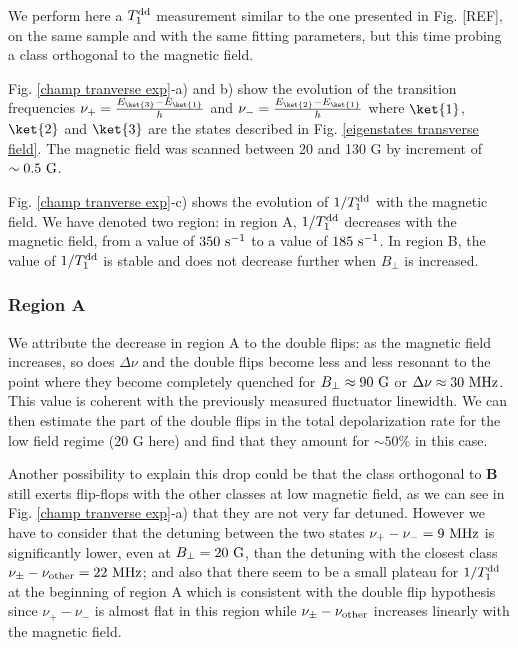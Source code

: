\documentclass[a4paper,11pt]{report}
\begin{document}
\begin{refsection}
We perform here a $T_1^{\rm dd}$ measurement similar to the one presented in Fig. [REF], on the same sample and with the same fitting parameters, but this time probing a class orthogonal to the magnetic field.

Fig. \ref{champ tranverse exp}-a) and b) show the evolution of the transition frequencies $\nu_+=\frac{E_{\ket{3}}-E_{\ket{1}}}{h}$ and $\nu_-=\frac{E_{\ket{2}}-E_{\ket{1}}}{h}$ where $\ket{1}$, $\ket{2}$ and $\ket{3}$ are the states described in Fig. \ref{eigenstates transverse field}. The magnetic field was scanned between 20 and 130 G by increment of $\sim 0.5\ \rm G$.

Fig. \ref{champ tranverse exp}-c) shows the evolution of $1/T_1^{\rm dd}$ with the magnetic field. We have denoted two region: in region A, $1/T_1^{\rm dd}$ decreases with the magnetic field, from a value of $350\ \rm s^{-1}$ to a value of $185\ \rm s^{-1}$. In region B, the value of $1/T_1^{\rm dd}$ is stable and does not decrease further when $B_\perp$ is increased.

\subsubsection{Region A}

We attribute the decrease in region A to the double flips: as the magnetic field increases, so does $\Delta \nu$ and the double flips become less and less resonant to the point where they become completely quenched for $B_\perp \approx 90\ \rm G$ or $\Delta \nu \approx 30\ \rm MHz$. This value is coherent with the previously measured fluctuator linewidth. We can then estimate the part of the double flips in the total depolarization rate for the low field regime (20 G here) and find that they amount for $\sim 50\%$ in this case.

Another possibility to explain this drop could be that the class orthogonal to $\mathbf{B}$ still exerts flip-flops with the other classes at low magnetic field, as we can see in Fig. \ref{champ tranverse exp}-a) that they are not very far detuned. However we have to consider that the detuning between the two states $\nu_+-\nu_-= 9\ \rm MHz$ is significantly lower, even at $B_\perp=20\ \rm G$, than the detuning with the closest class $\nu_\pm-\nu_{\rm other}= 22\ \rm MHz$; and also that there seem to be a small plateau for $1/T_1^{\rm dd}$ at the beginning of region A which is consistent with the double flip hypothesis since  $\nu_+-\nu_-$ is almost flat in this region while $\nu_\pm-\nu_{\rm other}$ increases linearly with the magnetic field.


\end{refsection}
\end{document}
